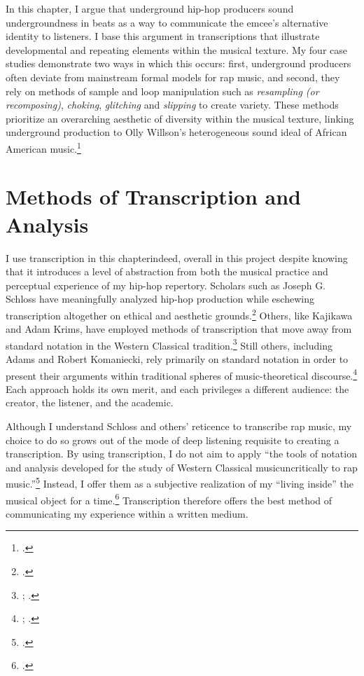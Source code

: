 In this chapter, I argue that underground hip-hop producers sound undergroundness in beats
as a way to communicate the emcee's alternative identity to listeners. I base this argument
in transcriptions that illustrate developmental and repeating elements within the musical 
texture. My four case studies demonstrate two ways in which this occurs: first, underground
producers often deviate from mainstream formal models for rap music, and second, they rely
on methods of sample and loop manipulation such as \emph{resampling (or recomposing)}, 
\emph{choking}, \emph{glitching} and \emph{slipping} to create variety. These methods
prioritize an overarching aesthetic of diversity within the musical texture, linking
underground production to Olly Willson's heterogeneous sound ideal of African American 
music.\footnote{
    \cite{ollywilsonHeterogeneousSoundIdeal1992}.}

\section{Methods of Transcription and Analysis} \label{methodsoftranscription}
I use transcription in this chapter\textemdash indeed, overall in this project\textemdash
despite  knowing that it introduces a level of abstraction from both the musical practice
and perceptual experience of my hip-hop repertory. Scholars such as Joseph G. Schloss 
have meaningfully analyzed hip-hop production while eschewing transcription altogether
on ethical and aesthetic grounds.\footnote{
    \autocite[13--15]{josephgschlossMakingBeatsArt2004}.} 
Others, like Kajikawa and Adam Krims, have employed methods of transcription that move
away from standard notation in the Western Classical tradition.\footnote{
    \autocite[29--30 and 36--37]{lorenkajikawaSoundingRaceRap2015};
    \autocite[105--110]{adamkrimsRapMusicPoetics2000}.} 
Still others, including Adams and Robert Komaniecki, rely primarily on standard notation
in order to present their arguments within traditional spheres of music-theoretical
discourse.\footnote{
    \cite{kyleadamsMetricalTechniquesFlow2009}; 
    \cite{robertkomanieckiAnalyzingCollaborativeFlow2017}.} 
Each approach holds its own merit, and each privileges a different audience: the creator,
the listener, and the academic.

Although I understand Schloss and others' reticence to transcribe rap music, my choice
to do so grows out of the mode of deep listening requisite to creating a transcription.
By using transcription, I do not aim to apply ``the tools of notation and analysis 
developed for the study of Western Classical music\textellipsis uncritically to rap
music.''\footnote{
    \autocite[12]{lorenkajikawaSoundingRaceRap2015}.}
Instead, I offer them as a subjective realization of my ``living inside'' the musical
object for a time.\footnote{
    \autocite[200]{peterwinklerWritingGhostNotes1997}.} 
Transcription therefore offers the best method of communicating my experience within
a written medium.

